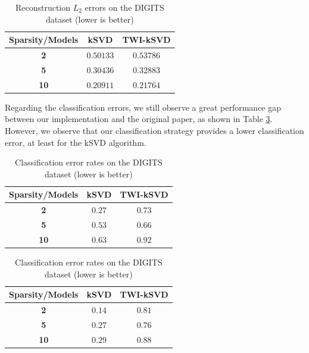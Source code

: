 \documentclass[11pt]{article}
\begin{document}
\begin{table}[!ht]
    \centering
        \begin{tabular}{ccc}
            \toprule
            \textbf{Sparsity/Models} & \textbf{kSVD} & \textbf{TWI-kSVD} \\
            \midrule
            \textbf{2} & $0.50133$ & $0.53786$ \\
            \textbf{5} & $0.30436$ & $0.32883$ \\
            \textbf{10} & $\bm{0.20911}$ & $\bm{0.21764}$ \\
            \bottomrule
        \end{tabular}
    \caption{Reconstruction $L_2$ errors on the DIGITS dataset (lower is better)}
    \label{tab:reconstruction_results_DIGITS}
\end{table}

Regarding the classification errors, we still observe a great performance gap between our implementation and the original paper, as shown in Table \ref{tab:classif_results_DIGITS}. However, we observe that our classification strategy provides a lower classification error, at least for the kSVD algorithm.

\begin{table}[!ht]
    \begin{minipage}{.55\linewidth}
      \centering
        \begin{tabular}{ccc}
            \toprule
            \textbf{Sparsity/Models} & \textbf{kSVD} & \textbf{TWI-kSVD} \\
            \midrule
            \textbf{2} & $\bm{0.27}$ & $0.73$ \\
            \textbf{5} & $0.53$ & $\bm{0.66}$ \\
            \textbf{10} & $0.63$ & $0.92$ \\
            \bottomrule
        \end{tabular}
        \caption*{Original classification strategy}
    \end{minipage}
    \begin{minipage}{.35\linewidth}
      \centering
        \begin{tabular}{ccc}
            \toprule
            \textbf{Sparsity/Models} & \textbf{kSVD} & \textbf{TWI-kSVD} \\
            \midrule
            \textbf{2} & $\bm{0.14}$ & $0.81$ \\
            \textbf{5} & $0.27$ & $\bm{0.76}$ \\
            \textbf{10} & $0.29$ & $0.88$ \\
            \bottomrule
        \end{tabular}
        \caption*{Our classification strategy}
    \end{minipage} 
    \caption{Classification error rates on the DIGITS dataset (lower is better)}
    \label{tab:classif_results_DIGITS}
\end{table}
\end{document}
